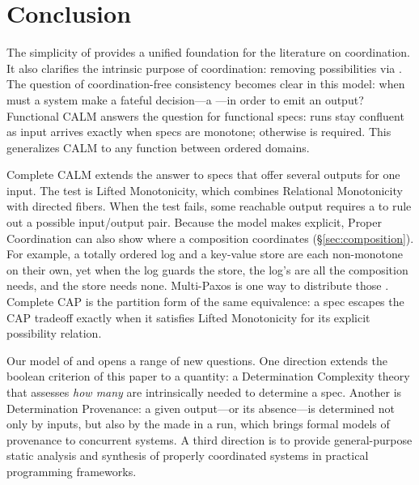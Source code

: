 \section{Conclusion}
\label{sec:conclusion}

The simplicity of \spectype[s] provides a unified foundation for the
literature on coordination. It also clarifies the intrinsic purpose of
coordination: removing possibilities via \commitments. The question of
coordination-free consistency becomes clear in this model: when must a system
make a fateful decision---a \commitment---in order to emit an output? Functional CALM answers
the question for functional specs:  runs stay confluent as input arrives exactly
when specs are monotone; otherwise \commitment is required.  This generalizes CALM to any function between ordered domains.

Complete CALM extends the answer to specs that offer several outputs
for one input.  The test is Lifted Monotonicity, which combines Relational
Monotonicity with directed fibers.  When the test fails, some reachable output
requires a \commitment to rule out a possible input/output pair.
Because the model makes \commitments explicit, Proper Coordination can also show where a
composition coordinates (\S\ref{sec:composition}).  For example, a totally ordered log
and a key-value store are each non-monotone on their own, yet when the log
guards the store, the log's \commitments are all the composition needs, and
the store needs none.  Multi-Paxos is one way to distribute those
\commitments.
Complete CAP is the partition form of the same equivalence: a spec escapes
the CAP tradeoff exactly when it satisfies Lifted Monotonicity for its explicit possibility relation.

Our model of \spectype[s] and \commitments opens a range of new questions.
One direction
extends the boolean criterion of this paper to a quantity: a Determination
Complexity theory that assesses \emph{how many} \commitments are intrinsically
needed to determine a spec. Another is Determination Provenance: a
given output---or its absence---is determined not only by inputs, but also by
the \commitments made in a run, which brings formal models of provenance to
concurrent systems. A third direction is to provide general-purpose static
analysis and synthesis of properly coordinated systems in practical programming frameworks.
